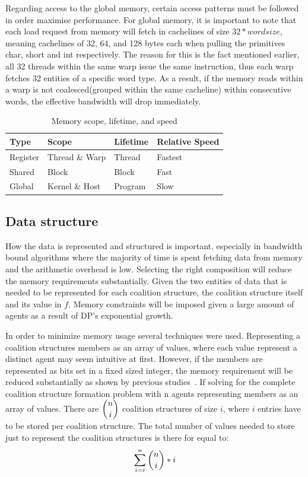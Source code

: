 \documentclass{llncs}
\begin{document}
Regarding access to the global memory, certain access patterns must be followed in order maximise performance. 
For global memory, it is important to note that each load request from memory will fetch in cachelines of size $32*wordsize$,
meaning cachelines of 32, 64, and 128 bytes each when pulling the primitives char, short and int respectively.
The reason for this is the fact mentioned earlier, all 32 threads within the same warp issue the same instruction, 
thus each warp fetches 32 entities of a specific word type.
As a result, if the memory reads within a warp is not coalesced(grouped within the same cacheline) within consecutive words, the effective bandwidth will drop immediately.

\begin{table}
\centering
\caption{Memory scope, lifetime, and speed \label{mem}}
\begin{tabular}{|l|l|l|l|} \hline
Type&Scope&Lifetime&Relative Speed \\ \hline
Register&Thread \& Warp&Thread&Fastest\\
Shared&Block&Block&Fast\\
Global&Kernel \& Host&Program&Slow\\
\hline\end{tabular}
\end{table}

\subsection{Data structure} %
How the data is represented and structured is important, 
especially in bandwidth bound algorithms where the majority of time
is spent fetching data from memory and the arithmetic overhead is low.
Selecting the right composition will reduce the memory requirements substantially.
Given the two entities of data that is needed to be represented for each coalition structure, 
the coalition structure itself and its value in $f$. 
Memory constraints will be imposed given a large amount of agents as a result of DP's exponential growth.

In order to minimize memory usage several techniques were used. 
Representing a coalition structures members as an array of values,
where each value represent a distinct agent may seem intuitive at first. 
However, if the members are represented as bits set in a fixed sized integer, the memory
requirement will be reduced substantially as shown by previous studies~\cite{boyer2012solving}.
If solving for the complete coalition structure formation problem with n agents representing members as an array of values.
There are \begin{math}\dbinom{n}{i}\end{math} coalition structures of size $i$, where
$i$ entries have to be stored per coalition structure.
The total number of values needed to store just to represent the coalition structures is there for equal to:
\begin{displaymath}\sum_{i=i}^{n} \dbinom{n}{i}*i\end{displaymath}
\end{document}
